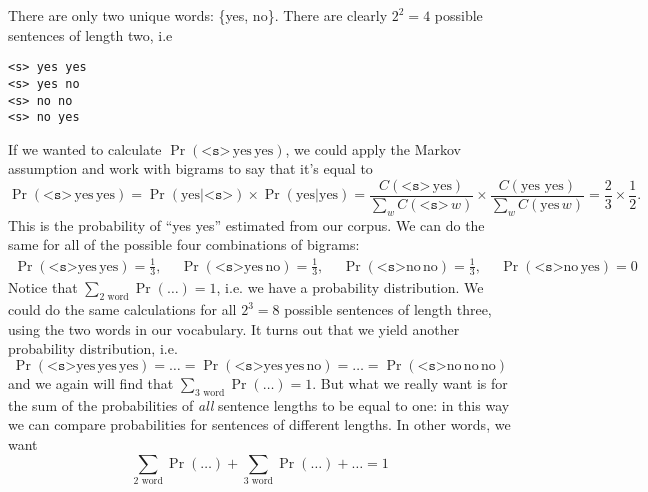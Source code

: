 \documentclass[12pt]{article}
\begin{document}
There are only two unique words: \{yes, no\}. There are clearly $2^2 = 4$ possible sentences of length two, i.e
\begin{verbatim}
<s> yes yes
<s> yes no
<s> no no
<s> no yes
\end{verbatim}
If we wanted to calculate $\Pr( \texttt{<s>} \, \textrm{yes} \, \textrm{yes})$, we could apply the Markov assumption and work with bigrams to say that it's equal to
\[
\Pr( \texttt{<s>} \, \textrm{yes} \, \textrm{yes}) = \Pr(\textrm{yes} | \texttt{<s>}) \times \Pr(\textrm{yes} | \textrm{yes}) = \frac{C(\texttt{<s>} \, \textrm{yes})}{\sum_w C(\texttt{<s>} \, w)} \times \frac{C(\textrm{yes yes})}{\sum_w C(\textrm{yes} \, w)} = \frac{2}{3} \times \frac{1}{2}.
\]
This is the probability of ``yes yes'' estimated from our corpus.
We can do the same for all of the possible four combinations of bigrams:
\begin{align*}
  \Pr(\texttt{<s>} \textrm{yes} \, \textrm{yes}) = \frac{1}{3}, \hspace{15pt}
  \Pr(\texttt{<s>} \textrm{yes} \, \textrm{no}) = \frac{1}{3}, \hspace{15pt}
  \Pr(\texttt{<s>} \textrm{no} \,\textrm{no} ) = \frac{1}{3}, \hspace{15pt}
  \Pr(\texttt{<s>} \textrm{no} \, \textrm{yes}) = 0
\end{align*}
Notice that $\sum_{2 \textrm{ word}} \Pr(\ldots) = 1$, i.e. we have a probability distribution. We could do the same calculations for all $2^3 = 8$ possible sentences of length three, using the two words in our vocabulary. It turns out that we yield another probability distribution, i.e.
\[
  \Pr(\texttt{<s>} \textrm{yes} \, \textrm{yes} \, \textrm{yes}) = \ldots = \Pr(\texttt{<s>} \textrm{yes} \, \textrm{yes} \, \textrm{no}) = \ldots = \Pr(\texttt{<s>} \textrm{no} \, \textrm{no} \, \textrm{no})
\]
and we again will find that $\sum_{3 \textrm{ word}} \Pr(\ldots) = 1$. But what we really want is for the sum of the probabilities of \emph{all} sentence lengths to be equal to one: in this way we can compare probabilities for sentences of different lengths. In other words, we want
\[
  \sum_{2 \textrm{ word}} \Pr(\ldots) + \sum_{3 \textrm{ word}} \Pr(\ldots) + \ldots = 1
\]
\end{document}
